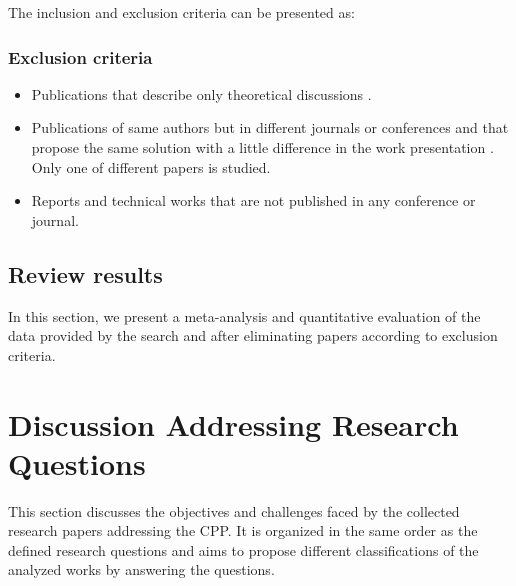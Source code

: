 \documentclass{IEEEtran}
\begin{document}
The inclusion and exclusion criteria can be presented as:
\subsubsection{Exclusion criteria}
\begin{itemize}
    \item Publications that describe only theoretical discussions \cite{SoXi17}.
    \item Publications of same authors but in different journals or conferences and that propose the same solution with a little difference in the work presentation \cite{HuWa12,HuWe13,HuWa14}. Only one of different papers is studied.
    \item Reports and technical works that are not published in any conference or journal.
\end{itemize}


\subsection{Review results}
In this section, we present a meta-analysis and quantitative evaluation of the data provided by the search and after eliminating papers according to exclusion criteria. 



\section{Discussion Addressing Research Questions}
This section discusses the objectives and challenges faced by the collected research papers addressing the CPP. It is organized in the same order as the defined research questions and aims to propose different classifications of the analyzed works by answering the questions.
\end{document}
